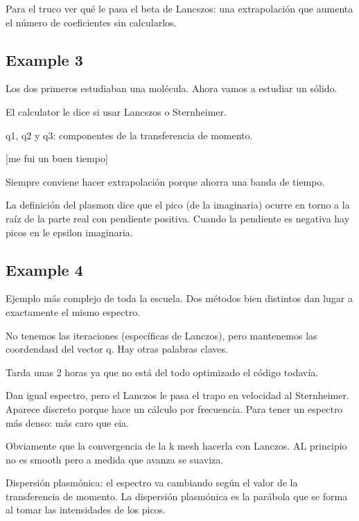   Para el truco ver qué le pasa el beta de Lancszos: una extrapolación que aumenta el número de coeficientes sin calcularlos.

\subsection{Example 3}

  Los dos primeros estudiaban una molécula. Ahora vamos a estudiar un sólido.

  El calculator le dice si usar Lancszos o Sternheimer.

  q1, q2 y q3: componentes de la transferencia de momento.

  [me fui un buen tiempo]

  Siempre conviene hacer extrapolación porque ahorra una banda de tiempo.

  La definición del plasmon dice que el pico (de la imaginaria) ocurre en torno a la raíz de la parte real con pendiente positiva. Cuando la pendiente es negativa hay picos en le epsilon imaginaria.

\subsection{Example 4}

  Ejemplo más complejo de toda la escuela. Dos métodos bien distintos dan lugar a exactamente el mismo espectro.

  No tenemos las iteraciones (específicas de Lanczos), pero mantenemos las coordendasd del vector q. Hay otras palabras claves.

  Tarda unas 2 horas ya que no está del todo optimizado el código todavía.

  Dan igual espectro, pero el Lanczos le pasa el trapo en velocidad al Sternheimer. Aparece discreto porque hace un cálculo por frecuencia. Para tener un espectro más denso: más caro que eia.

  Obviamente que la convergencia de la k mesh hacerla con Lanczos. AL principio no es smooth pero a medida que avanza se suaviza.

  Dispersión plasmónica: el espectro va cambiando según el valor de la transferencia de momento. La dispersión plasmónica es la parábola que se forma al tomar las intensidades de los picos. 
